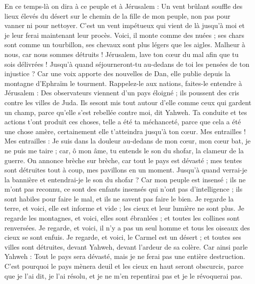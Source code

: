 \begin{multicols}{2}
En ce temps-là on dira à ce peuple et à Jérusalem : Un vent brûlant souffle des lieux élevés du désert sur le chemin de la fille de mon peuple, non pas pour vanner ni pour nettoyer.
C'est un vent impétueux qui vient de là jusqu'à moi et je leur ferai maintenant leur procès. 
Voici, il monte comme des nuées ; ses chars sont comme un tourbillon, ses chevaux sont plus légers que les aigles. Malheur à nous, car nous sommes détruits !
Jérusalem, lave ton cœur du mal afin que tu sois délivrées ! Jusqu'à quand séjourneront-tu au-dedans de toi les pensées de ton injustice ?
Car une voix apporte des nouvelles de Dan, elle publie depuis la montagne d'Ephraïm le tourment.
Rappelez-le aux nations, faites-le entendre à Jérusalem : Des observateurs viennent d'un pays éloigné ; ils poussent des cris contre les villes de Juda.
Ils sesont mis tout autour d'elle comme ceux qui gardent un champ, parce qu'elle s'est rebellée contre moi, dit Yahweh.
Ta conduite et tes actions t'ont produit ces choses, telle a été ta méchanceté, parce que cela a été une chose amère, certainement elle t'atteindra jusqu'à ton cœur.
Mes entrailles ! Mes entrailles : Je suis dans la douleur au-dedans de mon cœur, mon cœur bat, je ne puis me taire ; car, ô mon âme, tu entends le son du shofar, la clameur de la guerre.
On annonce brèche sur brèche, car tout le pays est dévasté ; mes tentes sont détruites tout à coup, mes pavillons en un moment.
Jusqu'à quand verrai-je la bannière et entendrai-je le son du shofar ?
Car mon peuple est insensé ; ils ne m'ont pas reconnu, ce sont des enfants insensés qui n'ont pas d'intelligence ; ils sont habiles pour faire le mal, et ils ne savent pas faire le bien.
Je regarde la terre, et voici, elle est informe et vide ; les cieux et leur lumière ne sont plus.
Je regarde les montagnes, et voici, elles sont ébranlées ; et toutes les collines sont renversées.
Je regarde, et voici, il n'y a pas un seul homme et tous les oiseaux des cieux se sont enfuis.
Je regarde, et voici, le Carmel est un désert ; et toutes ses villes sont détruites, devant Yahweh, devant l'ardeur de sa colère.
Car ainsi parle Yahweh : Tout le pays sera dévasté, mais je ne ferai pas une entière destruction.
C'est pourquoi le pays mènera deuil et les cieux en haut seront obscurcis, parce que je l'ai dit, je l'ai résolu, et je ne m'en repentirai pas et je le révoquerai pas.

\end{multicols}
